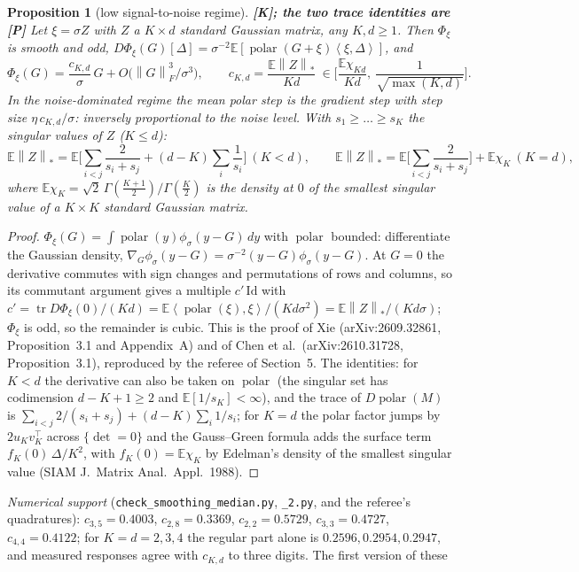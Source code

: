 \documentclass[11pt]{article}
\newtheorem{proposition}[theorem]{Proposition}
\theoremstyle{definition}
\theoremstyle{remark}
\newcommand{\E}{\mathbb{E}}
\newcommand{\nnuc}[1]{\left\|#1\right\|_{*}}
\newcommand{\nF}[1]{\left\|#1\right\|_{F}}
\newcommand{\inner}[2]{\left\langle #1, #2 \right\rangle}
\newcommand{\tr}{\operatorname{tr}}
\newcommand{\polar}{\operatorname{polar}}
\begin{document}
\begin{proposition}[low signal-to-noise regime]\label{prop:lowsnr} \textbf{[K]; the two trace identities are [P]}
Let $\xi=\sigma Z$ with $Z$ a $K\times d$ standard Gaussian matrix, any $K,d\ge1$. Then $\Phi_\xi$ is smooth and odd,
$D\Phi_\xi(G)[\Delta]=\sigma^{-2}\E[\polar(G+\xi)\inner\xi\Delta]$, and
\[
\Phi_\xi(G)=\frac{c_{K,d}}\sigma\,G+O\big(\nF G^3/\sigma^3\big),\qquad c_{K,d}=\frac{\E\nnuc Z}{Kd}\ \in\Big[\frac{\E\chi_{Kd}}{Kd},\ \frac1{\sqrt{\max(K,d)}}\Big].
\]
In the noise-dominated regime the mean polar step is the gradient step with step size $\eta\,c_{K,d}/\sigma$:
\emph{inversely proportional to the noise level}. With $s_1\ge\dots\ge s_K$ the singular values of $Z$ ($K\le d$):
\[
\E\nnuc Z=\E\Big[\sum_{i<j}\frac2{s_i+s_j}+(d-K)\sum_i\frac1{s_i}\Big]\ (K<d),\qquad
\E\nnuc Z=\E\Big[\sum_{i<j}\frac2{s_i+s_j}\Big]+\E\chi_K\ (K=d),
\]
where $\E\chi_K=\sqrt2\,\Gamma(\frac{K+1}2)/\Gamma(\frac K2)$ is the density at $0$ of the smallest singular value of a
$K\times K$ standard Gaussian matrix.
\end{proposition}
\begin{proof}
$\Phi_\xi(G)=\int\polar(y)\phi_\sigma(y-G)\,dy$ with $\polar$ bounded: differentiate the Gaussian density,
$\nabla_G\phi_\sigma(y-G)=\sigma^{-2}(y-G)\phi_\sigma(y-G)$. At $G=0$ the derivative commutes with sign changes and
permutations of rows and columns, so its commutant argument gives a multiple $c'\,\mathrm{Id}$ with
$c'=\tr D\Phi_\xi(0)/(Kd)=\E\inner{\polar(\xi)}{\xi}/(Kd\sigma^2)=\E\nnuc Z/(Kd\sigma)$; $\Phi_\xi$ is odd, so the
remainder is cubic. This is the proof of Xie (arXiv:2609.32861, Proposition~3.1 and Appendix~A) and of Chen et al.\
(arXiv:2610.31728, Proposition~3.1), reproduced by the referee of Section~5. The identities: for $K<d$ the derivative can
also be taken on $\polar$ (the singular set has codimension $d-K+1\ge2$ and $\E[1/s_K]<\infty$), and the trace of
$D\polar(M)$ is $\sum_{i<j}2/(s_i+s_j)+(d-K)\sum_i1/s_i$; for $K=d$ the polar factor jumps by $2u_Kv_K^\top$ across
$\{\det=0\}$ and the Gauss--Green formula adds the surface term $f_K(0)\,\Delta/K^2$, with $f_K(0)=\E\chi_K$ by Edelman's
density of the smallest singular value (SIAM J.\ Matrix Anal.\ Appl.\ 1988).
\end{proof}
\noindent\emph{Numerical support} (\texttt{check\_smoothing\_median.py}, \texttt{\_2.py}, and the referee's quadratures):
$c_{3,5}=0.4003$, $c_{2,8}=0.3369$, $c_{2,2}=0.5729$, $c_{3,3}=0.4727$, $c_{4,4}=0.4122$; for $K=d=2,3,4$ the regular part
alone is $0.2596,0.2954,0.2947$, and measured responses agree with $c_{K,d}$ to three digits. The first version of these
\end{document}
